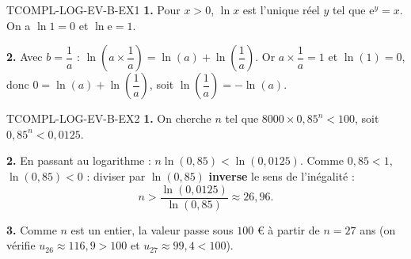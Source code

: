 \begin{corrige}{TCOMPL-LOG-EV-B-EX1}
\textbf{1.} Pour $x>0$, $\ln x$ est l'unique réel $y$ tel que $\mathrm{e}^y=x$. On a $\ln 1 = 0$ et $\ln \mathrm{e} = 1$.

\textbf{2.} Avec $b=\dfrac{1}{a}$ : $\ln\!\left(a\times\dfrac{1}{a}\right) = \ln(a) + \ln\!\left(\dfrac{1}{a}\right)$. Or $a\times\dfrac{1}{a}=1$ et $\ln(1)=0$, donc $0 = \ln(a)+\ln\!\left(\dfrac{1}{a}\right)$, soit $\ln\!\left(\dfrac{1}{a}\right) = -\ln(a)$.
\end{corrige}

\begin{corrige}{TCOMPL-LOG-EV-B-EX2}
\textbf{1.} On cherche $n$ tel que $8000\times0{,}85^n < 100$, soit $0{,}85^n < 0{,}0125$.

\textbf{2.} En passant au logarithme : $n\ln(0{,}85) < \ln(0{,}0125)$. Comme $0{,}85<1$, $\ln(0{,}85)<0$ : diviser par $\ln(0{,}85)$ \textbf{inverse} le sens de l'inégalité :
\[
  n > \frac{\ln(0{,}0125)}{\ln(0{,}85)} \approx 26{,}96.
\]

\textbf{3.} Comme $n$ est un entier, la valeur passe sous $100$ € à partir de $n=27$ ans (on vérifie $u_{26}\approx116{,}9 > 100$ et $u_{27}\approx99{,}4<100$).
\end{corrige}
